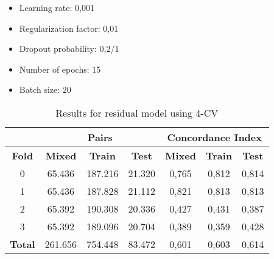 \begin{frame}
  \begin{itemize}
    \item Learning rate: 0,001
    \item Regularization factor: 0,01
    \item Dropout probability: 0,2/1
    \item Number of epochs: 15
    \item Batch size: 20
  \end{itemize}

  \begin{table}
    \centering
    \begin{tabular}{|c||c|c|c||c|c|c|}
      \cline{2-7}
      \multicolumn{1}{c|}{} & \multicolumn{3}{|c||}{\textbf{Pairs}} & 
      \multicolumn{3}{c|}{\textbf{Concordance Index}} \\
      \hline
      \textbf{Fold} & \textbf{Mixed} & \textbf{Train} & \textbf{Test} & 
      \textbf{Mixed} & \textbf{Train} & \textbf{Test} \\
      \hhline{=======}
      0 & 65.436 & 187.216 & 21.320 & 0,765 & 0,812 & 0,814 \\
      1 & 65.436 & 187.828 & 21.112 & 0,821 & 0,813 & 0,813 \\
      2 & 65.392 & 190.308 & 20.336 & 0,427 & 0,431 & 0,387 \\
      3 & 65.392 & 189.096 & 20.704 & 0,389 & 0,359 & 0,428 \\
      \hhline{=======}
      \textbf{Total} & 261.656 & 754.448 & 83.472 & 0,601 & 0,603 & 0,614 \\
      \hline
    \end{tabular}
  
    \caption[Residual 4-CV results]{
      Results for residual model using 4-CV \label{tab:results-residual-4CV}
    }
  \end{table}
\end{frame}